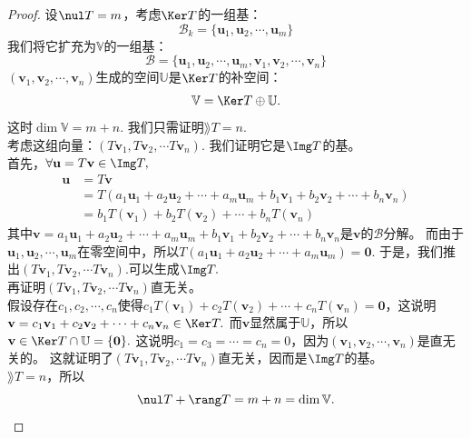 \documentclass[12pt,UTF8]{ctexbook}
\begin{document}
\begin{proof} %
    设$\nul T = m$，考虑$\Ker T$的一组基：
    $$ \mathcal{B}_k = \{\mathbf{u}_1, \mathbf{u}_2, \cdots, \mathbf{u}_m\}$$
    我们将它扩充为$\mathbb{V}$的一组基：
    $$ \mathcal{B} = \{\mathbf{u}_1, \mathbf{u}_2, \cdots, \mathbf{u}_m, \mathbf{v}_1, \mathbf{v}_2, \cdots, \mathbf{v}_n\}$$
    $(\mathbf{v}_1, \mathbf{v}_2, \cdots, \mathbf{v}_n)$生成的空间$\mathbb{U}$是$\Ker T$的补空间：
    $$ \mathbb{V} = \Ker T \oplus \mathbb{U}.$$
    这时$\dim \mathbb{V} = m+n.$ 我们只需证明$\rang T = n.$\\
    考虑这组向量：$(T\mathbf{v}_1, T\mathbf{v}_2, \cdots T\mathbf{v}_n).$ 
    我们证明它是$\Img T$的基。\\
    首先，$\forall \mathbf{u} = T\mathbf{v} \in \Img T,$
    \begin{align*}
        \mathbf{u} &= T\mathbf{v}  \\
                   &= T(a_1\mathbf{u}_1 + a_2\mathbf{u}_2 + \cdots + a_m\mathbf{u}_m + b_1\mathbf{v}_1 + b_2\mathbf{v}_2 + \cdots + b_n\mathbf{v}_n)  \\
                   &= b_1T(\mathbf{v}_1) + b_2T(\mathbf{v}_2) + \cdots + b_nT(\mathbf{v}_n) 
    \end{align*}
    其中$\mathbf{v} = a_1\mathbf{u}_1 + a_2\mathbf{u}_2 + \cdots + a_m\mathbf{u}_m + b_1\mathbf{v}_1 + b_2\mathbf{v}_2 + \cdots + b_n\mathbf{v}_n$是$\mathbf{v}$的$\mathcal{B}$分解。
    而由于$\mathbf{u}_1, \mathbf{u}_2, \cdots, \mathbf{u}_m$在零空间中，所以$T(a_1\mathbf{u}_1 + a_2\mathbf{u}_2 + \cdots + a_m\mathbf{u}_m) = \mathbf{0}.$
    于是，我们推出$(T\mathbf{v}_1, T\mathbf{v}_2, \cdots T\mathbf{v}_n).$可以生成$\Img T.$\\
    再证明$(T\mathbf{v}_1, T\mathbf{v}_2, \cdots T\mathbf{v}_n)$直无关。\\
    假设存在$c_1, c_2, \cdots, c_n$使得$c_1T(\mathbf{v}_1) + c_2T(\mathbf{v}_2) + \cdots + c_nT(\mathbf{v}_n) = \mathbf{0}$，这说明
    $\mathbf{v} = c_1\mathbf{v}_1 + c_2\mathbf{v}_2 + \cdots + c_n\mathbf{v}_n\in\Ker T.$ 而$\mathbf{v}$显然属于$\mathbb{U}$，所以$\mathbf{v}\in\Ker T \cap \mathbb{U} = \{\mathbf{0}\}.$
    这说明$c_1=c_3=\cdots=c_n=0$，因为$(\mathbf{v}_1, \mathbf{v}_2, \cdots, \mathbf{v}_n)$是直无关的。
    这就证明了$(T\mathbf{v}_1, T\mathbf{v}_2, \cdots T\mathbf{v}_n)$直无关，因而是$\Img T$的基。\\
    $\rang T = n$，所以
    $$ \nul T + \rang T = m + n = \dim \mathbb{V}. $$
\end{proof}
\end{document}
